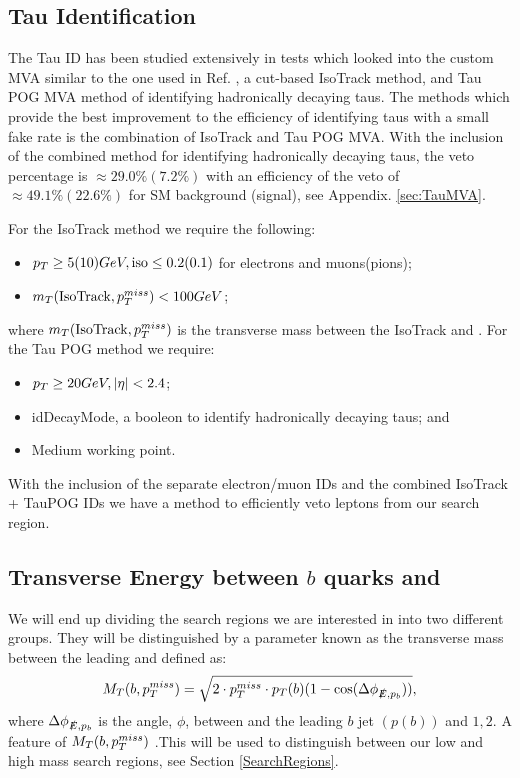 \subsection{Tau Identification}\label{TauID}
The Tau ID has been studied extensively in tests which looked into the custom MVA \cite{roe_boosted_2004, hoecker_tmva_2007, bravo_search_2015} similar to the one used in Ref. \cite{cms_collaboration_search_2016}, a cut-based IsoTrack method, and Tau POG MVA method of identifying hadronically decaying taus. The methods which provide the best improvement to the efficiency of identifying taus with a small fake rate is the combination of IsoTrack and Tau POG MVA. With the inclusion of the combined method for identifying hadronically decaying taus, the veto percentage is $\approx29.0\%(7.2\%)$ with an efficiency of the veto of $\approx49.1\%(22.6\%)$ for SM background (signal), see Appendix. \ref{sec:TauMVA}. 

For the IsoTrack method we require the following:
\begin{itemize}
	\item $p_{T}\geq5(10) GeV, \text{iso}\leq0.2(0.1)$ for electrons and muons(pions);
	\item $m_T(\text{IsoTrack},p_{T}^{miss})<100 GeV$;
\end{itemize}
where $m_T(\text{IsoTrack},p_{T}^{miss})$ is the transverse mass between the IsoTrack and \met. For the Tau POG method we require:
\begin{itemize}
	\item $p_{T}\geq20 GeV, |\eta|<2.4$;
	\item idDecayMode, a booleon to identify hadronically decaying taus; and
	\item Medium working point.
\end{itemize}
With the inclusion of the separate electron/muon IDs and the combined IsoTrack + TauPOG IDs we have a method to efficiently veto leptons from our search region.

\subsection{Transverse Energy between $b$ quarks and \met}
We will end up dividing the search regions we are interested in into two different groups. They will be distinguished by a parameter known as the transverse mass between the leading \bjet{} and \met{} defined as:
\begin{equation}\label{TransverseMass}
M_T(b,p_{T}^{miss})=\sqrt{2\cdot p_{T}^{miss}\cdot p_{T}(b)(1-\cos(\Delta\phi_{\slashed{E},p_b}))},
\end{equation}
where $\Delta\phi_{\slashed{E},p_b}$ is the angle, $\phi$, between \met and the leading $b$ jet $(p(b))$ and $1,2$. A feature of $M_T(b,p_{T}^{miss})$ .This will be used to distinguish between our low and high mass search regions, see Section \ref{SearchRegions}.

